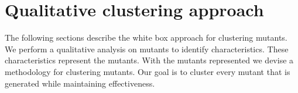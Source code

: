 \documentclass[../main]{subfiles}
\begin{document}
\chapter{Qualitative clustering approach}
\label{ch:reserach_question1}
The following sections describe the white box approach for clustering mutants.
We perform a qualitative analysis on mutants to identify characteristics. 
These characteristics represent the mutants.
With the mutants represented we devise a methodology for clustering mutants.
Our goal is to cluster every mutant that is generated while maintaining effectiveness.


\end{document}
